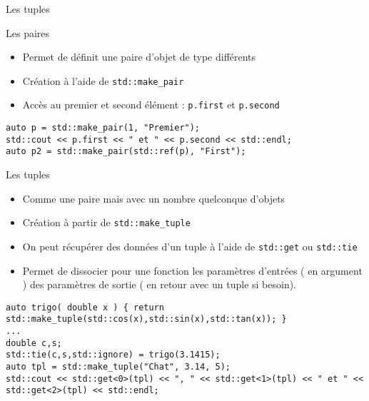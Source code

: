 \documentclass[handout,10pt]{beamer}
\begin{document}
\begin{frame}[fragile]{Les tuples}
 \tiny
 \begin{block}{Les paires}
 \begin{itemize}
  \item Permet de définit une paire d'objet de type différents
  \item Création à l'aide de \lstinline$std::make_pair$
  \item Accès au premier et second élément : \lstinline$p.first$ et \lstinline$p.second$
 \end{itemize}
\begin{lstlisting}
auto p = std::make_pair(1, "Premier");
std::cout << p.first << " et " << p.second << std::endl;
auto p2 = std::make_pair(std::ref(p), "First");
\end{lstlisting}
 \end{block}

 \begin{block}{Les tuples}
  \begin{itemize}
   \item Comme une paire mais avec un nombre quelconque d'objets
   \item Création à partir de  \lstinline$std::make_tuple$
   \item On peut récupérer des données d'un tuple à l'aide de \lstinline$std::get$ ou \lstinline$std::tie$
   \item Permet de dissocier pour une fonction les paramètres d'entrées ( en argument ) des paramètres de sortie ( en retour avec un tuple si besoin).
  \end{itemize}
\begin{lstlisting}
auto trigo( double x ) { return std::make_tuple(std::cos(x),std::sin(x),std::tan(x)); }
...
double c,s;
std::tie(c,s,std::ignore) = trigo(3.1415);
auto tpl = std::make_tuple("Chat", 3.14, 5);
std::cout << std::get<0>(tpl) << ", " << std::get<1>(tpl) << " et " << std::get<2>(tpl) << std::endl;
\end{lstlisting}

 \end{block}

\end{frame}
\end{document}
